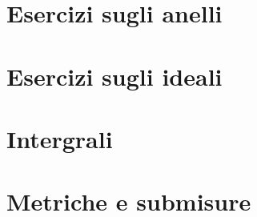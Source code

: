 \section{Esercizi sugli anelli} 
\section{Esercizi sugli ideali} 
\section{Intergrali} 
\section{Metriche e submisure} 
